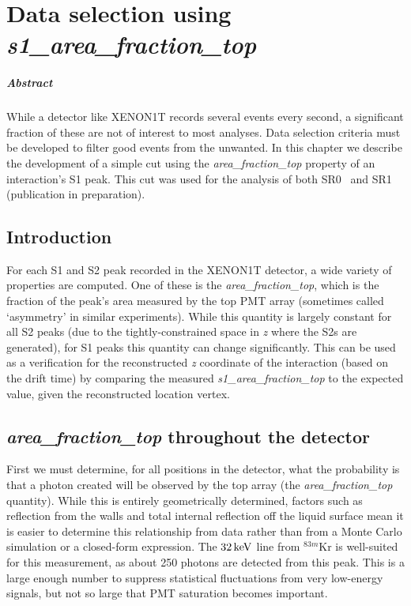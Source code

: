 
\chapter{Data selection using \textit{s1\_area\_fraction\_top}}\label{app:s1aft}

\paragraph{Abstract} While a detector like XENON1T records several events every second, a significant fraction of these are not of interest to most analyses. Data selection criteria must be developed to filter good events from the unwanted. In this chapter we describe the development of a simple cut using the \textit{area\_fraction\_top} property of an interaction's S1 peak. This cut was used for the analysis of both SR0~\cite{Aprile:2017iyp} and SR1 (publication in preparation).

\section{Introduction}

For each S1 and S2 peak recorded in the XENON1T detector, a wide variety of properties are computed. One of these is the \textit{area\_fraction\_top}, which is the fraction of the peak's area measured by the top PMT array (sometimes called `asymmetry' in similar experiments). While this quantity is largely constant for all S2 peaks (due to the tightly-constrained space in \textit{z} where the S2s are generated), for S1 peaks this quantity can change significantly. This can be used as a verification for the reconstructed \textit{z} coordinate of the interaction (based on the drift time) by comparing the measured \textit{s1\_area\_fraction\_top} to the expected value, given the reconstructed location vertex.

\section{\textit{area\_fraction\_top} throughout the detector}

First we must determine, for all positions in the detector, what the probability is that a photon created will be observed by the top array (the \textit{area\_fraction\_top} quantity). While this is entirely geometrically determined, factors such as reflection from the walls and total internal reflection off the liquid surface mean it is easier to determine this relationship from data rather than from a Monte Carlo simulation or a closed-form expression. The $32\,\mathrm{keV}$ line from $^{83m}$Kr is well-suited for this measurement, as about 250 photons are detected from this peak. This is a large enough number to suppress statistical fluctuations from very low-energy signals, but not so large that PMT saturation becomes important.

